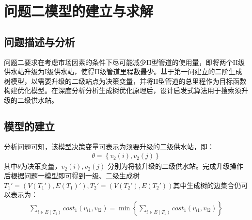 \documentclass{whutmod}
\begin{document}
	\section{问题二模型的建立与求解}
		\subsection{问题描述与分析}	
			问题二要求在考虑市场因素的条件下尽可能减少II型管道的使用量，即将两个II级供水站升级为I级供水站，使得II级管道里程数最少。基于第一问建立的二阶生成树模型，以需要升级的二级站点为决策变量，并将II型管道的总里程作为目标函数构建优化模型。在深度分析分析生成树优化原理后，设计启发式算法用于搜索须升级的二级供水站。
			\subsection{模型的建立}
			分析问题可知，该模型决策变量可表示为须要升级的二级供水站，即：
				\begin{gather}
				\theta =\left \{ v_2(i),v_2(j) \right \}
				\end{gather}
			其中$\theta$为决策变量，$v_2(i),v_2(j)$ 分别为将被升级的二级供水站。完成升级操作后根据问题一模型即可得到一级、二级生成树$T_{1}'=(V(T_{1}'),E(T_{1})'),T_{2}'=(V(T_{2}'),E(T_{2}'))$其中生成树的边集合仍可以表示为：
			\begin{gather}
			\displaystyle \sum_{i\in E(T_1) }cost_1(v_{i1},v_{i2})=\min\left \{ 	\sum_{i\in E(T_1) }cost_1(v_{i1},v_{i2}) \right \}
			\end{gather}
			
\end{document}
